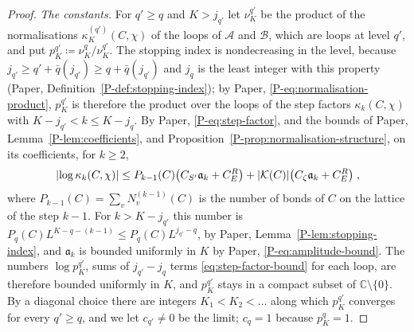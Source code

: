 \documentclass[11pt]{preprint}
\DeclarePairedDelimiter{\abs}{\lvert}{\rvert}
\numberwithin{equation}{section}
\theoremstyle{definition}
\theoremstyle{remark}
\theoremstyle{plain}
\begin{document}
\begin{proof}
\emph{The constants.} For $q' \geq q$ and $K > j_{q'}$ let $\nu^{q'}_K$ be the product of the normalisations $\kappa^{(q')}_K(C, \chi)$ of the loops of $\mathcal A$ and $\mathcal B$, which are loops at level $q'$, and put $p^{q'}_K \coloneqq \nu^q_K/\nu^{q'}_K$. The stopping index is nondecreasing in the level, because $j_{q'} \geq q' + \bar q(j_{q'}) \geq q + \bar q(j_{q'})$ and $j_q$ is the least integer with this property (Paper, Definition~\ref{P-def:stopping-index}); by Paper, \eqref{P-eq:normalisation-product}, $p^{q'}_K$ is therefore the product over the loops of the step factors $\kappa_k(C, \chi)$ with $K - j_{q'} < k \leq K - j_q$. By Paper, \eqref{P-eq:step-factor}, and the bounds of Paper, Lemma~\ref{P-lem:coefficients}, and Proposition~\ref{P-prop:normalisation-structure}, on its coefficients, for $k \geq 2$,
\begin{equation}\label{eq:step-factor-bound}
    \abs{\log\kappa_k(C, \chi)} \leq P_{k-1}(C)\bigl(C_{S'}\mathfrak a_k + C^R_E\bigr) + \abs{\mathcal K(C)}\bigl(C_\zeta\mathfrak a_k + C^R_E\bigr)\;,
\end{equation}
where $P_{k-1}(C) = \sum_vN^{(k-1)}_v(C)$ is the number of bonds of $C$ on the lattice of the step $k - 1$. For $k > K - j_{q'}$ this number is $P_q(C)L^{K-q-(k-1)} \leq P_q(C)L^{j_{q'}-q}$, by Paper, Lemma~\ref{P-lem:stopping-index}, and $\mathfrak a_k$ is bounded uniformly in $K$ by Paper, \eqref{P-eq:amplitude-bound}. The numbers $\log p^{q'}_K$, sums of $j_{q'} - j_q$ terms \eqref{eq:step-factor-bound} for each loop, are therefore bounded uniformly in $K$, and $p^{q'}_K$ stays in a compact subset of $\mathbb C \setminus \{ 0 \}$. By a diagonal choice there are integers $K_1 < K_2 < \dots$ along which $p^{q'}_K$ converges for every $q' \geq q$, and we let $c_{q'} \neq 0$ be the limit; $c_q = 1$ because $p^q_K = 1$.


\end{proof}
\end{document}
